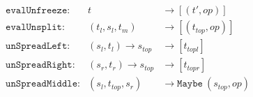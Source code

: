 \documentclass[12pt,a4paper,twoside,openany]{report} \usepackage[pdfborder={0 0 0}]{hyperref}    %
\theoremstyle{definition} \newtheorem{definition}{Definition}[section]
\begin{document}
      \begin{equation} 
        \begin{aligned} 
          &\texttt{evalUnfreeze}: &t &\to [(t', op)]\\ 
          &\texttt{evalUnsplit}: &(t_l, s_l, t_m) &\to [(t_{top}, op)]\\ 
          &\texttt{unSpreadLeft}: &(s_l, t_l) \to s_{top} &\to [t_{topl}]  \\
                  &\texttt{unSpreadRight}: &(s_r, t_r) \to s_{top} &\to [t_{topr}]  \\
                  &\texttt{unSpreadMiddle}:
                  &(s_l,t_{top},s_r) &\to \texttt{Maybe}~(s_{top}, op)  \\ 
        \end{aligned} 
        \label{eq:pvOps}
      \end{equation}
\end{document}
